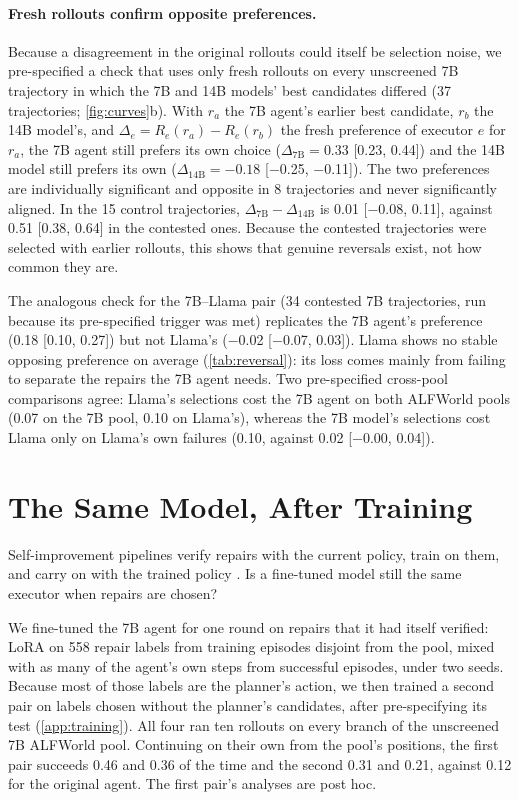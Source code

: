 \documentclass{article}
\theoremstyle{plain}
\theoremstyle{definition}
\theoremstyle{remark}
\begin{document}
\paragraph{Fresh rollouts confirm opposite preferences.}
Because a disagreement in the original rollouts could itself be selection noise, we pre-specified a check that uses only fresh rollouts on every unscreened 7B trajectory in which the 7B and 14B models' best candidates differed (37 trajectories; \cref{fig:curves}b). With $r_a$ the 7B agent's earlier best candidate, $r_b$ the 14B model's, and $\Delta_e=R_e(r_a)-R_e(r_b)$ the fresh preference of executor $e$ for $r_a$, the 7B agent still prefers its own choice ($\Delta_{\mathrm{7B}}=0.33$ [0.23, 0.44]) and the 14B model still prefers its own ($\Delta_{\mathrm{14B}}=-0.18$ [$-$0.25, $-$0.11]). The two preferences are individually significant and opposite in 8 trajectories and never significantly aligned. In the 15 control trajectories, $\Delta_{\mathrm{7B}}-\Delta_{\mathrm{14B}}$ is 0.01 [$-$0.08, 0.11], against 0.51 [0.38, 0.64] in the contested ones. Because the contested trajectories were selected with earlier rollouts, this shows that genuine reversals exist, not how common they are.

The analogous check for the 7B--Llama pair (34 contested 7B trajectories, run because its pre-specified trigger was met) replicates the 7B agent's preference (0.18 [0.10, 0.27]) but not Llama's ($-$0.02 [$-$0.07, 0.03]). Llama shows no stable opposing preference on average (\cref{tab:reversal}): its loss comes mainly from failing to separate the repairs the 7B agent needs. Two pre-specified cross-pool comparisons agree: Llama's selections cost the 7B agent on both ALFWorld pools (0.07 on the 7B pool, 0.10 on Llama's), whereas the 7B model's selections cost Llama only on Llama's own failures (0.10, against 0.02 [$-$0.00, 0.04]).

\section{The Same Model, After Training}
\label{sec:training}

Self-improvement pipelines verify repairs with the current policy, train on them, and carry on with the trained policy \citep{song2024eto,yuan2025agentr}. Is a fine-tuned model still the same executor when repairs are chosen?

We fine-tuned the 7B agent for one round on repairs that it had itself verified: LoRA \citep{hu2022lora} on 558 repair labels from training episodes disjoint from the pool, mixed with as many of the agent's own steps from successful episodes, under two seeds. Because most of those labels are the planner's action, we then trained a second pair on labels chosen without the planner's candidates, after pre-specifying its test (\cref{app:training}). All four ran ten rollouts on every branch of the unscreened 7B ALFWorld pool. Continuing on their own from the pool's positions, the first pair succeeds 0.46 and 0.36 of the time and the second 0.31 and 0.21, against 0.12 for the original agent. The first pair's analyses are post hoc.
\end{document}
